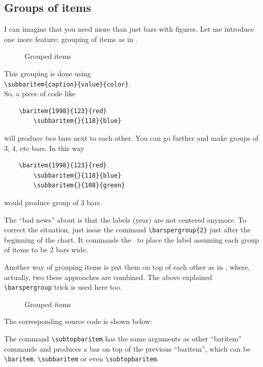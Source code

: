 \documentclass[12pt]{article}
\begin{document}
\subsection{Groups of items \label{sec:2.3}}
I can imagine that you need more than just bars with figures. Let me
introduce one more feature: grouping of items as in .
\begin{figure}[t]\centering
  
\caption{\label{fig:6} Grouped items}
\end{figure}
This grouping is done using\\
\verb+\subbaritem{caption}{value}{color}+. \\
So, a piece of code like
\begin{verbatim}
    \baritem{1998}{123}{red}
        \subbaritem{}{118}{blue}
\end{verbatim}
will produce \emph{two} bars next to each other.
You can go further and make groups of 3, 4, etc bars. In this way 
\begin{verbatim}
    \baritem{1998}{123}{red}
        \subbaritem{}{118}{blue}
        \subbaritem{}{108}{green}
\end{verbatim}
would produce group of 3 bars.

The ``bad news'' about  is that the labels (year) 
are not centered anymore. To correct the situation, just issue the command
\verb+\barspergroup{2}+ 
just after the beginning of the chart. It commands
the \bardiag\ to place the label assuming each group of items to be 2 bars wide.

Another way of grouping items is put them on top of each other
as in , where, actually, two these approaches are combined. 
The above explained \verb+\barspergroup+ trick is used here too.
\begin{figure}[ht]\centering
  
\caption{\label{fig:7} Grouped items}
\end{figure}
The corresponding source code is shown below:

The command \verb+\subtopbaritem+  has
the same arguments as other ``baritem'' commands and produces a bar on
top of the previous ``baritem'', which can be \verb+\baritem+, 
\verb+\subbaritem+ or even \verb+\subtopbaritem+.
\end{document}
